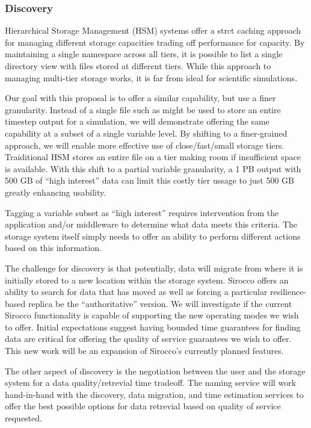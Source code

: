 \subsubsection{Discovery}

Hierarchical Storage Management (HSM) systems offer a strct caching approach
for managing different storage capacities trading off performance for capacity.
By maintaining a single namespace across all tiers, it is possible to list a
single directory view with files stored at different tiers. While this approach
to managing multi-tier storage works, it is far from ideal for scientific
simulations.

Our goal with this proposal is to offer a similar capability, but use a finer
granularity. Instead of a single file such as might be used to store an entire
timestep output for a simulation, we will demonstrate offering the same
capability at a subset of a single variable level. By shifting to a
finer-grained approach, we will enable more effective use of close/fast/small
storage tiers. Traiditional HSM stores an entire file on a tier making room if
insufficient space is available. With this shift to a partial variable
granularity, a 1 PB output with 500 GB of ``high interest'' data can limit this
costly tier ussage to just 500 GB greatly enhancing usability.

Tagging a variable subset as ``high interest'' requires intervention from the
application and/or middleware to determine what data meets this criteria. The
storage system itself simply needs to offer an ability to perform different
actions based on this information.

The challenge for discovery is that potentially, data will migrate from where
it is initially stored to a new location within the storage system. Sirocco
offers an ability to search for data that has moved as well as forcing a
particular resilience-based replica be the ``authoritative'' version. We will
investigate if the current Sirocco functionality is capable of supporting the
new operating modes we wish to offer. Initial expectations suggest having
bounded time guarantees for finding data are critical for offering the quality
of service guarantees we wish to offer. This new work will be an expansion of
Sirocco's currently planned features.

The other aspect of discovery is the negotiation between the user and the
storage system for a data quality/retrevial time tradeoff. The naming service
will work hand-in-hand with the discovery, data migration, and time estimation
services to offer the best possible options for data retrevial based on quality
of service requested.
